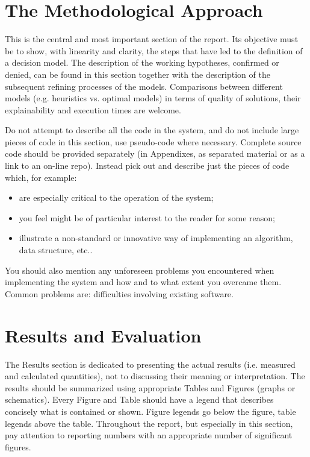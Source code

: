 \section{The Methodological Approach}

This is the central and most important section of the report. Its objective must be to show, with linearity and clarity, the steps that have led to the definition of a decision model. The description of the working hypotheses, confirmed or denied, can be found in this section together with the description of the subsequent refining processes of the models. Comparisons between different models (e.g. heuristics vs. optimal models) in terms of quality of solutions, their explainability and execution times are welcome. 

Do not attempt to describe all the code in the system, and do not include large pieces of code in this section, use pseudo-code where necessary. Complete source code should be provided separately (in Appendixes, as separated material or as a link to an on-line repo). Instead pick out and describe just the pieces of code which, for example:
\begin{itemize}
\item are especially critical to the operation of the system;
\item you feel might be of particular interest to the reader for some reason;
\item  illustrate a non-standard or innovative way of implementing an algorithm, data
structure, etc..
\end{itemize}

You should also mention any unforeseen problems you encountered when implementing the
system and how and to what extent you overcame them. Common problems are:
 difficulties involving existing software.


\section{Results and Evaluation}
The Results section is dedicated to presenting the actual results (i.e. measured and calculated quantities), not to discussing their meaning or interpretation. The results should be summarized using appropriate Tables and Figures (graphs or schematics). Every Figure and Table should have a legend that describes concisely what is contained or shown. Figure legends go below the figure, table legends above the table. Throughout the report, but especially in this section, pay attention to reporting numbers with an appropriate number of significant figures. 

